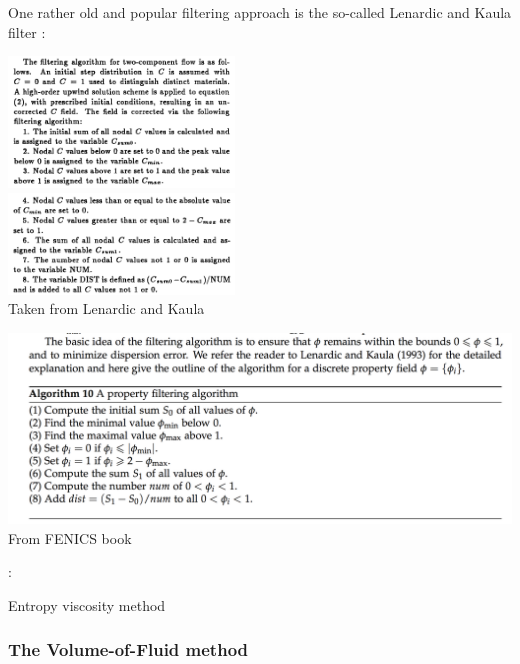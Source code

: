 One rather old and popular filtering approach is the so-called Lenardic and Kaula filter \cite{leka93}:

\begin{center}
\includegraphics[width=6cm]{images/compositions/leka93_filter1}\\
\includegraphics[width=6cm]{images/compositions/leka93_filter2}\\
{\captionfont Taken from Lenardic and Kaula \cite{leka93}}
\end{center}

\begin{center}
\includegraphics[width=16cm]{images/compositions/leka93_filter3}\\
{\captionfont From FENICS book}
\end{center}

\Literature: \cite{vyrc13}

Entropy viscosity method \cite{gupa11}







\subsubsection{The Volume-of-Fluid method}

